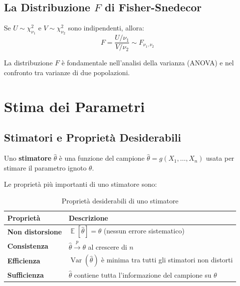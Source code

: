 \documentclass[12pt, a4paper]{article}
\DeclareMathOperator{\Var}{Var}
\DeclareMathOperator{\E}{\mathbb{E}}
\begin{document}
\subsection{La Distribuzione $F$ di Fisher-Snedecor}

\begin{definizione}[Distribuzione $F$]
  Se $U \sim \chi^2_{\nu_1}$ e $V \sim \chi^2_{\nu_2}$ sono
  indipendenti, allora:
  \[
    F = \frac{U/\nu_1}{V/\nu_2} \sim F_{\nu_1, \nu_2}
  \]
\end{definizione}

La distribuzione $F$ è fondamentale nell'analisi della varianza (ANOVA)
e nel confronto tra varianze di due popolazioni.

\section{Stima dei Parametri}

\subsection{Stimatori e Proprietà Desiderabili}

\begin{definizione}[Stimatore]
  Uno \textbf{stimatore} $\hat{\theta}$ è una funzione del campione
  $\hat{\theta} = g(X_1, \ldots, X_n)$ usata per stimare
  il parametro ignoto $\theta$.
\end{definizione}

Le proprietà più importanti di uno stimatore sono:

\begin{table}[h!]
  \centering
  \caption{Proprietà desiderabili di uno stimatore}
  \begin{tabular}{>{\bfseries}p{3.5cm} p{9cm}}
    \toprule
    Proprietà & Descrizione \\
    \midrule
    Non distorsione & $\E[\hat\theta] = \theta$ (nessun errore sistematico) \\[4pt]
    Consistenza     & $\hat\theta \xrightarrow{p} \theta$ al crescere di $n$ \\[4pt]
    Efficienza      & $\Var(\hat\theta)$ è minima tra tutti gli stimatori non distorti \\[4pt]
    Sufficienza     & $\hat\theta$ contiene tutta l'informazione del campione su $\theta$ \\
    \bottomrule
  \end{tabular}
\end{table}
\end{document}
